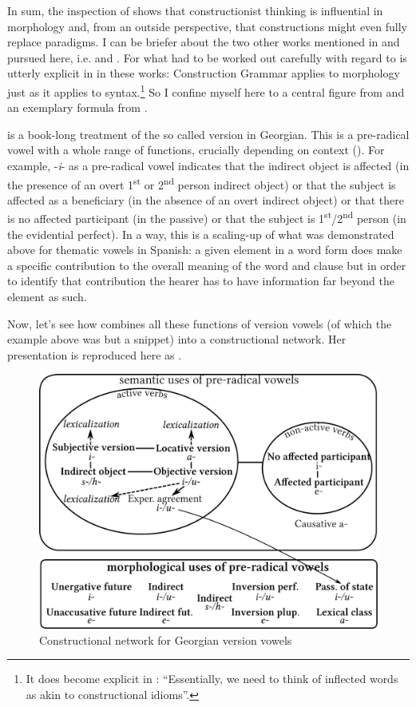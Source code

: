 \documentclass[output=paper]{langsci/langscibook}
\begin{document}
In sum, the inspection of \citet{Spencer2001} shows that constructionist thinking is influential in morphology and, from an outside perspective, that constructions might even fully replace paradigms. I can be briefer about the two other works mentioned in \citet[59]{Haspelmath2011} and pursued here, i.e. \citet{Gurevich2006} and \citet{Booij2010}. For what had to be worked out carefully with regard to \citet{Spencer2001} is utterly explicit in in these works: Construction Grammar applies to morphology just as it applies to syntax.\footnote{It does become explicit in \citet[84]{Spencer2004}: “Essentially, we need to think of inflected words as akin to constructional idioms”.} So I confine myself here to a central figure from \citet[170]{Gurevich2006} and an exemplary formula from \citet[241]{Booij2010}.

\citet{Gurevich2006} is a book-long treatment of the so called version in Georgian. This is a pre-radical vowel with a whole range of functions, crucially depending on context (\citealt[6--13]{Gurevich2006}). For example, \nobreakdash-\textit{i}\nobreakdash- as a pre-radical vowel indicates that the indirect object is affected (in the presence of an overt 1\textsuperscript{st} or 2\textsuperscript{nd} person indirect object) or that the subject is affected as a beneficiary (in the absence of an overt indirect object) or that there is no affected participant (in the passive) or that the subject is 1\textsuperscript{st}/2\textsuperscript{nd} person (in the evidential perfect). In a way, this is a scaling-up of what was demonstrated above for thematic vowels in Spanish: a given element in a word form does make a specific contribution to the overall meaning of the word and clause but in order to identify that contribution the hearer has to have information far beyond the element as such.

Now, let’s see how \citet[170]{Gurevich2006} combines all these functions of version vowels (of which the example above was but a snippet) into a constructional network. Her presentation is reproduced here as .

  
\begin{figure}
\includegraphics[width=.75\textwidth]{figures/Reiner2.pdf}
 \caption{Constructional network for Georgian version vowels\linebreak\citep[170]{Gurevich2006}}
 \label{fig:reiner:2}
\end{figure}
\end{document}
